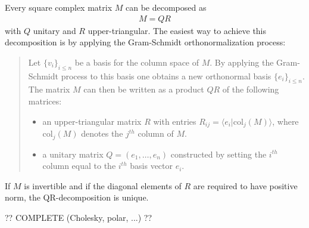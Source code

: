     \begin{method}[QR Decomposition]
        Every square complex matrix $M$ can be decomposed as
        \begin{gather}
            M = QR
        \end{gather}
        with $Q$ unitary and $R$ upper-triangular. The easiest way to achieve this decomposition is by applying the Gram-Schmidt orthonormalization process:
        \begin{quote}
            Let $\{v_i\}_{i\leq n}$ be a basis for the column space of $M$. By applying the Gram-Schmidt process to this basis one obtains a new orthonormal basis $\{e_i\}_{i\leq n}$. The matrix $M$ can then be written as a product $QR$ of the following matrices:
            \begin{itemize}
                \item an upper-triangular matrix $R$ with entries $R_{ij} = \langle e_i|\mathrm{col}_j(M) \rangle$, where $\mathrm{col}_j(M)$ denotes the $j^{th}$ column of $M$.
                \item a unitary matrix $Q = (e_1,\ldots,e_n)$ constructed by setting the $i^{th}$ column equal to the $i^{th}$ basis vector $e_i$.
            \end{itemize}
        \end{quote}
    \end{method}
    \begin{property}
        If $M$ is invertible and if the diagonal elements of $R$ are required to have positive norm, the QR-decomposition is unique.
    \end{property}

    ?? COMPLETE (Cholesky, polar, ...) ??